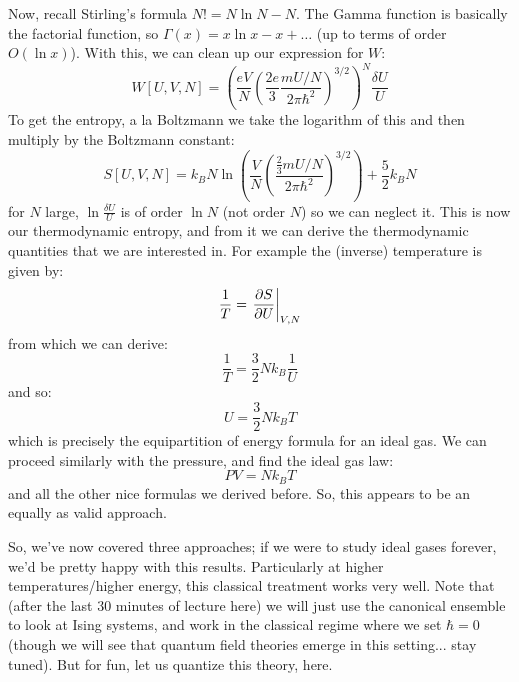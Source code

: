 Now, recall Stirling's formula $N! = N\ln N - N$. The Gamma function is basically the factorial function, so $\Gamma(x) = x\ln x - x + \ldots$ (up to terms of order $O(\ln x)$). With this, we can clean up our expression for $W$:
\begin{equation}
    W[U, V, N] = \left(\frac{eV}{N}\left(\frac{2e}{3}\frac{mU/N}{2\pi \hbar^2}\right)^{3/2}\right)^{N}\frac{\delta U}{U}
\end{equation}
To get the entropy, a la Boltzmann we take the logarithm of this and then multiply by the Boltzmann constant:
\begin{equation}
    S[U, V, N] = k_B N\ln\left(\frac{V}{N}\left(\frac{\frac{2}{3}mU/N}{2\pi\hbar^2}\right)^{3/2}\right) + \frac{5}{2}k_B N
\end{equation}
for $N$ large, $\ln\frac{\delta U}{U}$ is of order $\ln N$ (not order $N$) so we can neglect it. This is now our thermodynamic entropy, and from it we can derive the thermodynamic quantities that we are interested in. For example the (inverse) temperature is given by:
\begin{equation}
    \frac{1}{T} = \left. \frac{\partial S}{\partial U}\right|_{V, N}
\end{equation}
from which we can derive:
\begin{equation}
    \frac{1}{T} = \frac{3}{2}Nk_B \frac{1}{U}
\end{equation}
and so:
\begin{equation}
    U = \frac{3}{2}Nk_B T
\end{equation}
which is precisely the equipartition of energy formula for an ideal gas. We can proceed similarly with the pressure, and find the ideal gas law:
\begin{equation}
    PV = Nk_B T
\end{equation}
and all the other nice formulas we derived before. So, this appears to be an equally as valid approach.

So, we've now covered three approaches; if we were to study ideal gases forever, we'd be pretty happy with this results. Particularly at higher temperatures/higher energy, this classical treatment works very well. Note that (after the last 30 minutes of lecture here) we will just use the canonical ensemble to look at Ising systems, and work in the classical regime where we set $\hbar = 0$ (though we will see that quantum field theories emerge in this setting... stay tuned). But for fun, let us quantize this theory, here.

